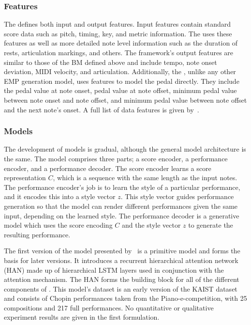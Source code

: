 \subsubsection{Features}
The \vnetf{} defines both input and output features. Input features contain standard score data such as pitch, timing, key, and metric information. The \vnetf{} uses these features as well as more detailed note level information such as the duration of rests, articulation markings, and others. The framework's output features are similar to those of the BM defined above and include tempo, note onset deviation, MIDI velocity, and articulation. Additionally, the \vnetf{}, unlike any other EMP generation model, uses features to model the pedal directly. They include the pedal value at note onset, pedal value at note offset, minimum pedal value between note onset and note offset, and minimum pedal value between note offset and the next note's onset. A full list of data features is given by~\citet{jeong2019score}. 

\subsubsection{Models}
The development of \vnet{} models is gradual, although the general model architecture is the same. The model comprises three parts; a score encoder, a performance encoder, and a performance decoder. The score encoder learns a score representation $C$, which is a sequence with the same length as the input notes. The performance encoder's job is to learn the style of a particular performance, and it encodes this into a style vector $z$. This style vector guides performance generation so that the model can render different performances given the same input, depending on the learned style. The performance decoder is a generative model which uses the score encoding $C$ and the style vector $z$ to generate the resulting performance. 

The first version of the \vnet{} model presented by~\citet{jeong2018virtuosonet} is a primitive model and forms the basis for later versions. It introduces a recurrent hierarchical attention network (HAN) made up of hierarchical LSTM layers used in conjunction with the attention mechanism. The HAN forms the building block for all of the different components of \vnet{}. This model's dataset is an early version of the KAIST dataset and consists of Chopin performances taken from the Piano-e-competition, with 25 compositions and 217 full performances. No quantitative or qualitative experiment results are given in the first formulation. 

